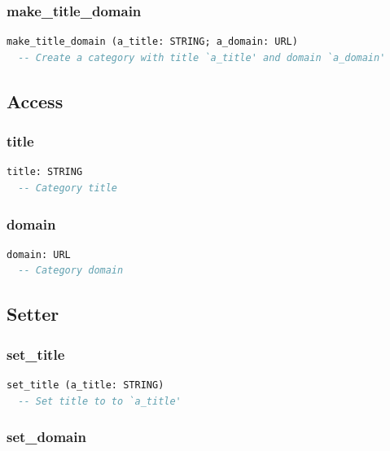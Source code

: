 \subsubsection{make\_title\_domain}

\begin{lstlisting}[language=Eiffel]
make_title_domain (a_title: STRING; a_domain: URL)
  -- Create a category with title `a_title' and domain `a_domain'
\end{lstlisting}


\subsection{Access}

\label{sec:category-access}

\subsubsection{title}

\begin{lstlisting}[language=Eiffel]
title: STRING
  -- Category title
\end{lstlisting}

\subsubsection{domain}

\begin{lstlisting}[language=Eiffel]
domain: URL
  -- Category domain
\end{lstlisting}


\subsection{Setter}
\label{sec:category-setter}

\subsubsection{set\_title}

\begin{lstlisting}[language=Eiffel]
set_title (a_title: STRING)
  -- Set title to to `a_title'
\end{lstlisting}

\subsubsection{set\_domain}

